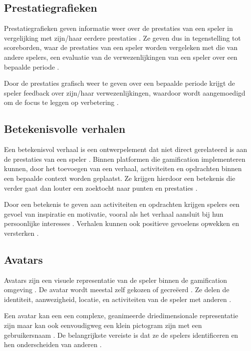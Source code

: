 \subsection{Prestatiegrafieken}

Prestatiegrafieken geven informatie weer over de prestaties van een speler in vergelijking met zijn/haar eerdere prestaties \autocite{Sailer2013}. Ze geven dus in tegenstelling tot scoreborden, waar de prestaties van een speler worden vergeleken met die van andere spelers, een evaluatie van de verwezenlijkingen van een speler over een bepaalde periode \autocite{Sailer2016}.
 
Door de prestaties grafisch weer te geven over een bepaalde periode krijgt de speler feedback over zijn/haar verwezenlijkingen, waardoor wordt aangemoedigd om de focus te leggen op verbetering \autocite{Sailer2013}.

\subsection{Betekenisvolle verhalen}

Een betekenisvol verhaal is een ontwerpelement dat niet direct gerelateerd is aan de prestaties van een speler \autocite{Sailer2016}. Binnen platformen die gamification implementeren kunnen, door het toevoegen van een verhaal, activiteiten en opdrachten binnen een bepaalde context worden geplaatst. Ze krijgen hierdoor een betekenis die verder gaat dan louter een zoektocht naar punten en prestaties \autocite{Kapp2012}.

Door een betekenis te geven aan activiteiten en opdrachten krijgen spelers een gevoel van inspiratie en motivatie, vooral als het verhaal aansluit bij hun persoonlijke interesses \autocite{Sailer2016}. Verhalen kunnen ook positieve gevoelens opwekken en versterken \autocite{Sailer2013}.

\subsection{Avatars}

Avatars zijn een visuele representatie van de speler binnen de gamification omgeving \autocite{Sailer2016}. De avatar wordt meestal zelf gekozen of gecreëerd \autocite{Kapp2012}. Ze delen de identiteit, aanwezigheid, locatie, en activiteiten van de speler met anderen \autocite{Annetta2010}.

Een avatar kan een een complexe, geanimeerde driedimensionale representatie zijn \autocite{Sailer2016} maar kan ook eenvoudigweg een klein pictogram zijn met een gebruikersnaam \autocite{Zichermann2011}. De belangrijkste vereiste is dat ze de spelers identificeren en hen onderscheiden van anderen \autocite{Sailer2016}.

